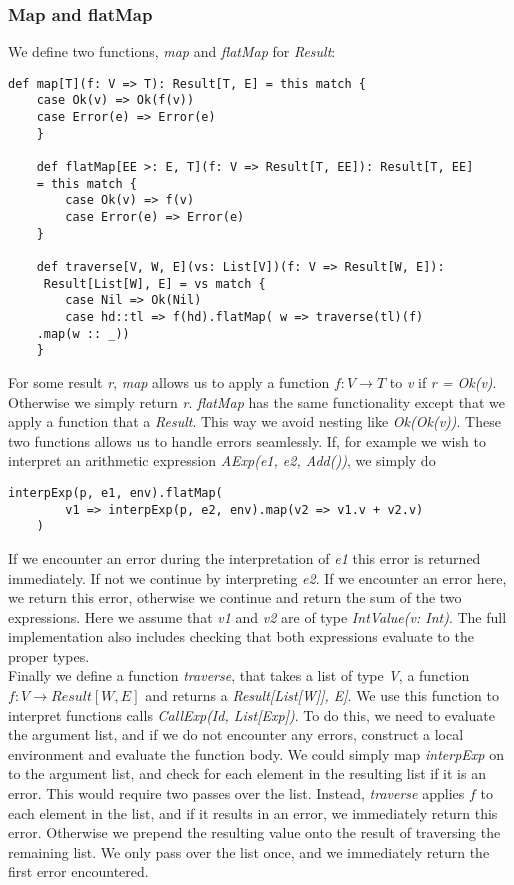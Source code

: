 \subsubsection{Map and flatMap}

We define two functions, \textsl{map} and \textsl{flatMap} for \textsl{Result}:

\begin{lstlisting}[style=simple]
	def map[T](f: V => T): Result[T, E] = this match {
	case Ok(v) => Ok(f(v))
	case Error(e) => Error(e)
	}
	
	def flatMap[EE >: E, T](f: V => Result[T, EE]): Result[T, EE] 
	= this match {
		case Ok(v) => f(v)
		case Error(e) => Error(e)
	}
	
	def traverse[V, W, E](vs: List[V])(f: V => Result[W, E]):
	 Result[List[W], E] = vs match {
		case Nil => Ok(Nil)
		case hd::tl => f(hd).flatMap( w => traverse(tl)(f)
	.map(w :: _))
	}
\end{lstlisting}
For some result \textsl{r}, \textsl{map} allows us to apply a function $f: V \rightarrow T$ to \textsl{v} if \textsl{r = Ok(v)}. Otherwise we simply return \textsl{r}. \textsl{flatMap} has the same functionality except that we apply a function that a \textsl{Result}. This way we avoid nesting like \textsl{Ok(Ok(v))}. These two functions allows us to handle errors seamlessly. If, for example we wish to interpret an arithmetic expression \textsl{AExp(e1, e2, Add())}, we simply do 

\begin{lstlisting}[style=simple]
	interpExp(p, e1, env).flatMap(
		v1 => interpExp(p, e2, env).map(v2 => v1.v + v2.v)
	)
\end{lstlisting}
If we encounter an error during the interpretation of \textsl{e1} this error is returned immediately. If not we continue by interpreting \textsl{e2}. If we encounter an error here, we return this error, otherwise we continue and return the sum of the two expressions. Here we assume that \textsl{v1} and \textsl{v2} are of type \textsl{IntValue(v: Int)}. The full implementation also includes checking that both expressions evaluate to the proper types.
\\
Finally we define a function \textsl{traverse}, that takes a list of type \textsl{V}, a function $f: V \rightarrow Result[W, E]$ and returns a \textsl{Result[List[W]], E]}. We use this function to interpret functions calls \textsl{CallExp(Id, List[Exp])}. To do this, we need to evaluate the argument list, and if we do not encounter any errors, construct a local environment and evaluate the function body. We could simply map \textsl{interpExp} on to the argument list, and check for each element in the resulting list if it is an error. This would require two passes over the list. Instead, \textsl{traverse} applies $f$ to each element in the list, and if it results in an error, we immediately return this error. Otherwise we prepend the resulting value onto the result of traversing the remaining list. We only pass over the list once, and we immediately return the first error encountered.
